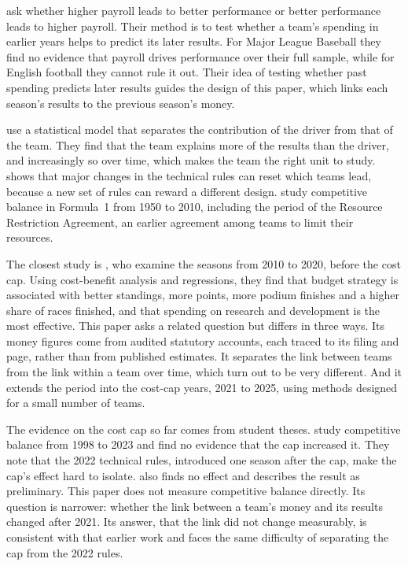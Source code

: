 \documentclass[11pt,a4paper]{article}
\begin{document}
\citet{hall2002} ask whether higher payroll leads to better performance or
better performance leads to higher payroll. Their method is to test whether a team's spending in earlier years helps to
predict its later results. For Major League Baseball they find no evidence that payroll drives performance over their full
sample, while for English football they cannot rule it out. Their idea of testing whether past spending predicts later
results guides the design of this paper, which links each season's results to the previous season's money.

\citet{bell2016} use a statistical model that separates the contribution of
the driver from that of the team. They find that the team explains more of the results than the driver, and increasingly so
over time, which makes the team the right unit to study. \citet{jenkins2010} shows that major changes in the technical rules
can reset which teams lead, because a new set of rules can reward a different design. \citet{judde2013} study competitive
balance in Formula~1 from 1950 to 2010, including the period of the Resource Restriction Agreement, an earlier agreement
among teams to limit their resources.

The closest study is \citet{lonik2024}, who examine the seasons from 2010 to
2020, before the cost cap. Using cost-benefit analysis and regressions, they find that budget strategy is associated with
better standings, more points, more podium finishes and a higher share of races finished, and that spending on research and
development is the most effective. This paper asks a related question but differs in three ways. Its money figures come
from audited statutory accounts, each traced to its filing and page, rather than from published estimates. It separates
the link between teams from the link within a team over time, which turn out to be very different. And it extends the
period into the cost-cap years, 2021 to 2025, using methods designed for a small number of teams.

The evidence on the cost cap so far comes from student theses. \citet{foghsgaard2024} study
competitive balance from 1998 to 2023 and find no evidence that the cap increased it. They note that the 2022 technical
rules, introduced one season after the cap, make the cap's effect hard to isolate. \citet{jung2023} also finds no effect and
describes the result as preliminary. This paper does not measure competitive balance directly. Its question is narrower:
whether the link between a team's money and its results changed after 2021. Its answer, that the link did not change
measurably, is consistent with that earlier work and faces the same difficulty of separating the cap from the 2022 rules.
\end{document}
